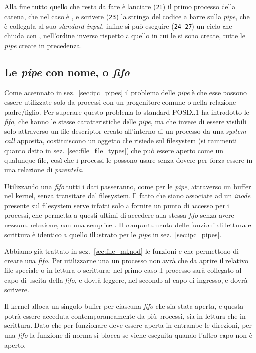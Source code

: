 Alla fine tutto quello che resta da fare è lanciare (\texttt{\small 21}) il
primo processo della catena, che nel caso è , e scrivere
(\texttt{\small 23}) la stringa del codice a barre sulla \textit{pipe}, che è
collegata al suo \textit{standard input}, infine si può eseguire
(\texttt{\small 24-27}) un ciclo che chiuda con , nell'ordine
inverso rispetto a quello in cui le si sono create, tutte le \textit{pipe}
create in precedenza.


\subsection{Le \textit{pipe} con nome, o \textit{fifo}}
\label{sec:ipc_named_pipe}

Come accennato in sez.~\ref{sec:ipc_pipes} il problema delle \textit{pipe} è
che esse possono essere utilizzate solo da processi con un progenitore comune
o nella relazione padre/figlio. Per superare questo problema lo standard
POSIX.1 ha introdotto le \textit{fifo}, che hanno le stesse caratteristiche
delle \textit{pipe}, ma che invece di essere visibili solo attraverso un file
descriptor creato all'interno di un processo da una \textit{system call}
apposita, costituiscono un oggetto che risiede sul filesystem (si rammenti
quanto detto in sez.~\ref{sec:file_file_types}) che può essere aperto come un
qualunque file, così che i processi le possono usare senza dovere per forza
essere in una relazione di \textsl{parentela}.

Utilizzando una \textit{fifo} tutti i dati passeranno, come per le
\textit{pipe}, attraverso un buffer nel kernel, senza transitare dal
filesystem. Il fatto che siano associate ad un \textit{inode} presente sul
filesystem serve infatti solo a fornire un punto di accesso per i processi,
che permetta a questi ultimi di accedere alla stessa \textit{fifo} senza avere
nessuna relazione, con una semplice . Il comportamento delle
funzioni di lettura e scrittura è identico a quello illustrato per le
\textit{pipe} in sez.~\ref{sec:ipc_pipes}.

Abbiamo già trattato in sez.~\ref{sec:file_mknod} le funzioni  e
 che permettono di creare una \textit{fifo}. Per utilizzarne una
un processo non avrà che da aprire il relativo file speciale o in lettura o
scrittura; nel primo caso il processo sarà collegato al capo di uscita della
\textit{fifo}, e dovrà leggere, nel secondo al capo di ingresso, e dovrà
scrivere.

Il kernel alloca un singolo buffer per ciascuna \textit{fifo} che sia stata
aperta, e questa potrà essere acceduta contemporaneamente da più processi, sia
in lettura che in scrittura. Dato che per funzionare deve essere aperta in
entrambe le direzioni, per una \textit{fifo} la funzione  di norma
si blocca se viene eseguita quando l'altro capo non è aperto.

